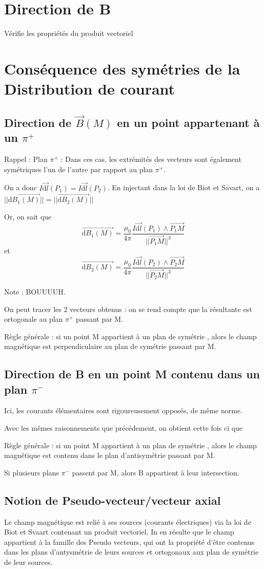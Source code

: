 \documentclass[french]{yLectureNote}
\renewcommand{\vec}{\overrightarrow}
\newcommand{\dd}{\mathrm{d}}
\newcommand{\norm}[1]{||\vec{#1}||}
\newcommand{\B}{\vec{B}(M)}
\newcommand{\pip}{\pi^+}
\newcommand{\pim}{\pi^-}
\begin{document}
\section{Direction de B}
Vérifie les propriétés du produit vectoriel
\section{Conséquence des symétries de la Distribution de courant}
\subsection{Direction de \(\B\) en un point appartenant à un \(\pip\)}
Rappel : Plan \(\pip\) : Dans ces cas, les extrémités des vecteurs sont également symétriques l'un de l'autre par rapport au plan \(\pip\).

On a donc  \(I\vec{\dd l}(P_1) = I\vec{\dd l}(P_2)\). En injectant dans la loi de Biot et Savart, on  a \(\norm{\dd B_1(M)} = \norm{\dd B_2(M)}\)

Or, on sait que \[\vec{\dd B_1(M)} = \frac{\mu_0}{4\pi}\frac{I\vec{\dd l}(P_1)\wedge \vec{P_1M}}{\norm{P_1M}^3}\] et
\[\vec{\dd B_2(M)} = \frac{\mu_0}{4\pi}\frac{I\vec{\dd l}(P_2)\wedge \vec{P_2M}}{\norm{P_2M}^3}\]

Note : BOUUUUH.

On peut tracer les 2 vecteurs obtenus : on se rend compte que la résultante est ortogonale au plan \(\pip\) passant par M.

Règle générale : si un point M appartient à un plan de symétrie , alors le champ magnétique est perpendiculaire au plan de symétrie passant par M.

\subsection{Direction de B en un point M contenu dans un plan \(\pim\)}
Ici, les courants élémentaires sont rigoureusement opposés, de m\^eme norme.

Avec les m\^emes raisonnements que précédement, on obtient cette fois ci que

Règle générale : si un point M appartient à un plan de symétrie , alors le champ magnétique est contenu dans le plan d'antisymétrie passant par M.

Si plusieurs plans \(\pim\) passent par M, alors B appartient à leur intersection.
\subsection{Notion de Pseudo-vecteur/vecteur axial}
Le champ magnétique est relié à ses sources (courants électriques) via la loi de Biot et Svaart contenant un produit vectoriel. In en résulte que le champ appartient à la famille des Pseudo vecteurs, qui ont la propriété d'\^etre contenus dans les plans d'antysmétrie de leurs sources et ortogonaux aux plan de symétrie de leur sources.
\end{document}
